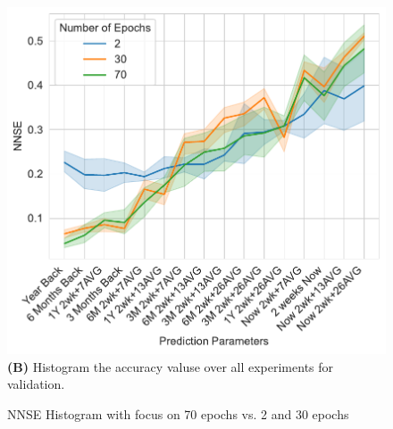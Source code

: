 \documentclass[utf8]{FrontiersinVancouver} %
\begin{document}
{\begin{figure}[p]
\begin{center}
\begin{minipage}[t]{0.65\textwidth}
        \includegraphics[width=1.0\linewidth]{images/A100-NNSE-all-epochs-validation.pdf}
        {\bf (B)} Histogram the accuracy valuse over all experiments for validation.
     \end{minipage}
  \end{center}

  \caption {NNSE Histogram with focus on 70 epochs vs. 2 and 30 epochs}
  \label{fig:NNSE-comparison-a100}

\end{figure}

\begin{figure}[p]


\end{figure}}
\end{document}
